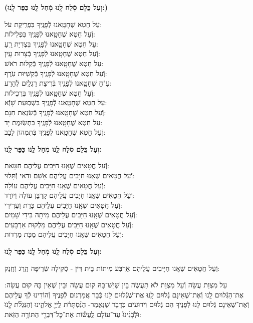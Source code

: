 \documentclass[twoside, openany, parskip=half, 11pt]{book}
\begin{document}
\begin{sometimes}
\textbf{(וְעַל כֻּלָם סְֿלַח לָֽנוּ מְֿחַל לָֽנוּ כַּפֵּר לָֽנוּ:)}

עַל חֵטְא שֶׁחָטָֽאנוּ לְֿפָנֶֽיךָ בִּפְרִֽיקַת עֹל:\\ וְֿעַל חֵטְא שֶׁחָטָֽאנוּ לְֿפָנֶֽיךָ בִּפְלִילוֹת: \\
עַל חֵטְא שֶׁחָטָֽאנוּ לְֿפָנֶֽיךָ בִּצְדִיַּת רֵֽעַ: \\ וְֿעַל חֵטְא שֶׁחָטָֽאנוּ לְֿפָנֶֽיךָ בְּֿצָרוּת עָֽיִן: \\
עַל חֵטְא שֶׁחָטָֽאנוּ לְֿפָנֶֽיךָ בְּֿקַלּוּת רֹאשׁ:\\ וְֿעַל חֵטְא שֶׁחָטָֽאנוּ לְֿפָנֶֽיךָ בְּֿקַשְׁיוּת עֹֽרֶף: \\
עַ"חֵ שֶׁחָטָֽאנוּ לְֿפָנֶֽיךָ בְּֿרִיצַת רַגְלַֽיִם לְֿהָרַע:\\ וְֿעַל חֵטְא שֶׁחָטָֽאנוּ לְֿפָנֶֽיךָ בִּרְכִילוּת: \\
עַל חֵטְא שֶׁחָטָֽאנוּ לְֿפָנֶֽיךָ בִּשְׁבֽוּעַת שָׁוְֿא: \\ וְֿעַל חֵטְא שֶׁחָטָֽאנוּ לְֿפָנֶֽיךָ בְּֿשִׂנְאַת חִנָם: \\
עַל חֵטְא שֶׁחָטָֽאנוּ לְֿפָנֶֽיךָ בִּתְשֽׂוּמֶת יָד:\\ וְֿעַל חֵטְא שֶׁחָטָֽאנוּ לְֿפָנֶֽיךָ בְּֿתִמְהוֹן לֵבָב:

\textbf{וְעַל כֻּלָם סְֿלַח לָֽנוּ מְֿחַל לָֽנוּ כַּפֵּר לָֽנוּ:}


וְֿעַל חֲטָאִים שֶׁאָֽנוּ חַיָּבִים עֲלֵיהֶם חַטָּאת:\\
וְֿעַל חֲטָאִים שֶׁאָֽנוּ חַיָּבִים עֲלֵיהֶם אָשָׁם וַדַאי וְֿתָּלוּי:\\
וְֿעַל חֲטָאִים שֶׁאָֽנוּ חַיָּבִים עֲלֵיהֶם עוֹלָה:\\
וְֿעַל חֲטָאִים שֶׁאָֽנוּ חַיָּבִים עֲלֵיהֶם קָרְֿבָּן עוֹלֶה וְֿיוֹרֵד:\\
וְֿעַל חֲטָאִים שֶׁאָֽנוּ חַיָּבִים עֲלֵיהֶם כָּרֵת וְֿעֲרִירִי:\\
וְֿעַל חֲטָאִים שֶׁאָֽנוּ חַיָּבִים עֲלֵיהֶם מִיתָה בִּידֵי שָׁמַיִם:\\
וְֿעַל חֲטָאִים שֶׁאָֽנוּ חַיָּבִים עֲלֵיהֶם מַּלְקּוּת אַרְבָּעִים:\\
וְֿעַל חֲטָאִים שֶׁאָֽנוּ חַיָּבִים עֲלֵיהֶם מַכַּת מַרְדוּת:



\textbf{וְעַל כֻּלָם סְֿלַח לָֽנוּ מְֿחַל לָֽנוּ כַּפֵּר לָֽנוּ:}

וְֿעַל חֲטָאִים שֶׁאָֽנוּ חַיָּיבִים עֲלֵיהֶם אַרְבַּע מִיתוֹת בֵּית דִּין - סְֿקִילָה שְֿׂרֵיפָה הֶֽרֶג וְֿחֶֽנֶק:

עַל מִצְוַת עֲשֵׂה וְֿעַל מִצְוַת לֹא תַעֲשֶׂה בֵּין שֶׁיֵשׁ־בָּהּ קוּם עֲשֵׂה וּבֵין שֶׁאֵין בָּהּ קוּם עֲשֵׂה: אֶת־הַגְּֿלוּיִם לָֽנוּ וְֿאֶת־שֶׁאֵינָם גְּֿלוּיִם לָֽנוּ אֶת־שֶׁגְּֿלוּיִם לָנוּ כְּֿבָר אֲמַרְנוּם לְֿפָנֶיךָ וְֿהוֹדִינוּ לְֿךָ עֲלֵיהֶם וְֿאֶת־שֶׁאֵינָם גְּֿלוּיִם לָנוּ לְֿפָנֶיךָ הֵם גְּֿלוּיִם וִידוּעִים כַּדָּבָר שֶׁנֶּאֱמַר- הַנִּ֨סְתָּרֹ֔ת
לַֽיְיָ֖ אֱלֹהֵ֑ינוּ וְֿהַנִּגְלֹ֞ת לָֹ֤נֹוֹּ וֹּלְֹֿבָֹנֵֹ֨יֹנֹוֹּ֙ עַד־עוֹלָ֔ם לַֽעֲשׂ֕וֹת אֶת־כׇּל־דִּבְרֵ֖י הַתּוֹרָ֥ה הַזֹּֽאת:


\end{sometimes}
\end{document}
